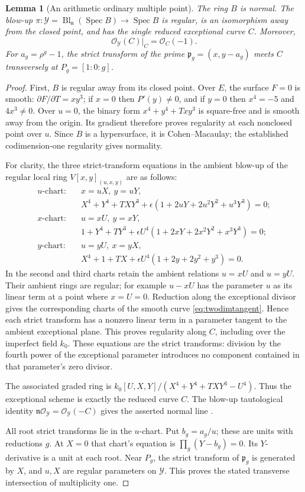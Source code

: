 \documentclass[11pt,a4paper]{article}
\newtheorem{lemma}[theorem]{Lemma}
\theoremstyle{remark}
\newcommand{\OO}{\mathcal O}
\newcommand{\Spec}{\operatorname{Spec}}
\begin{document}
\begin{lemma}[An arithmetic ordinary multiple point]
\label{lem:twodimblowup}
The ring $B$ is normal. The blow-up
$\pi:\mathcal Y=\operatorname{Bl}_{\mathfrak n}(\Spec B)\to\Spec B$
is regular, is an isomorphism away from the closed point, and has
the single reduced exceptional curve $C$. Moreover,
\[
 \OO_{\mathcal Y}(C)|_C=\OO_C(-1).
\]
For $a_g=\rho^g-1$, the strict transform of the prime
$\mathfrak p_g=(x,y-a_g)$ meets $C$ transversely at
$P_g=[1:0:g]$.
\end{lemma}
\begin{proof}
First, $B$ is regular away from its closed point. Over $E$, the
surface $F=0$ is smooth: $\partial F/\partial T=xy^3$; if $x=0$
then $P'(y)\ne0$, and if $y=0$ then $x^4=-5$ and $4x^3\ne0$.
Over $u=0$, the binary form $x^4+y^4+Txy^3$ is square-free and is
smooth away from the origin. Its gradient therefore proves regularity
at each nonclosed point over $u$. Since $B$ is a hypersurface, it is
Cohen--Macaulay; the established codimension-one regularity gives
normality.

For clarity, the three strict-transform equations in the ambient
blow-up of the regular local ring $V[x,y]_{(u,x,y)}$ are as follows:
\begin{align*}
 u\text{-chart:}\quad &x=uX,\ y=uY,\\[-3pt]
 &X^4+Y^4+TXY^3+
       \epsilon(1+2uY+2u^2Y^2+u^3Y^3)=0;\\
 x\text{-chart:}\quad &u=xU,\ y=xY,\\[-3pt]
 &1+Y^4+TY^3+
       \epsilon U^4(1+2xY+2x^2Y^2+x^3Y^3)=0;\\
 y\text{-chart:}\quad &u=yU,\ x=yX,\\[-3pt]
 &X^4+1+TX+
       \epsilon U^4(1+2y+2y^2+y^3)=0.
\end{align*}
In the second and third charts retain the ambient relations
$u=xU$ and $u=yU$. Their ambient rings are regular; for example
$u-xU$ has the parameter $u$ as its linear term at a point where
$x=U=0$. Reduction along the exceptional divisor gives the corresponding
charts of the smooth curve \eqref{eq:twodimtangent}. Hence each strict
transform has a nonzero linear term in a parameter tangent to the
ambient exceptional plane. This proves regularity along $C$, including
over the imperfect field $k_0$. These equations are the strict
transforms: division by the fourth power of the exceptional parameter
introduces no component contained in that parameter's zero divisor.

The associated graded ring is
$k_0[U,X,Y]/(X^4+Y^4+TXY^3-U^4)$. Thus the exceptional scheme is
exactly the reduced curve $C$. The blow-up tautological identity
$\mathfrak n\OO_{\mathcal Y}=\OO_{\mathcal Y}(-C)$ gives the asserted
normal line \cite[Section~31.33]{StacksBlowup}.

All root strict transforms lie in the $u$-chart. Put $b_g=a_g/u$;
these are units with reductions $g$. At $X=0$ that chart's equation is
$\prod_g(Y-b_g)=0$. Its $Y$-derivative is a unit at each root.
Near $P_g$, the strict transform of $\mathfrak p_g$ is generated by
$X$, and $u,X$ are regular parameters on $\mathcal Y$. This proves
the stated transverse intersection of multiplicity one.
\end{proof}
\end{document}
